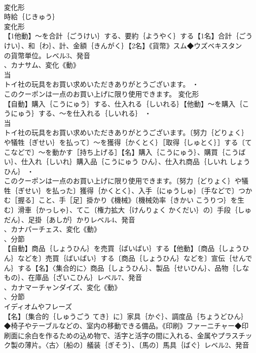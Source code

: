 \documentclass[8pt]{extreport}
\begin{document}
\begin{CJK}{UTF8}{min}
\\	変化形 
\\	時給｛じきゅう｝
\\	変化形 
\\	【1他動】～を合計｛ごうけい｝する、要約｛ようやく｝する【1名】合計｛ごうけい｝、和｛わ｝、計、金額｛きんがく｝【2名】《貨幣》スム◆ウズベキスタン
\\	の貨幣単位。レベル3、発音
\\	、カナサム、変化《動》
\\	当
\\	トイ社の玩具をお買い求めいただきありがとうございます。 ・
\\	このクーポンは一点のお買い上げに限り使用できます。	変化形 
\\	【自動】購入｛こうにゅう｝する、仕入れる｛しいれる｝【他動】～を購入｛こうにゅう｝する、～を仕入れる｛しいれる｝ ・
\\	当
\\	トイ社の玩具をお買い求めいただきありがとうございます。〔努力｛どりょく｝や犠牲｛ぎせい｝を払って〕～を獲得｛かくとく｝［取得｛しゅとく｝］する〔てこなどで〕～を動かす［持ち上げる］【名】購入｛こうにゅう｝、購買｛こうばい｝、仕入れ｛しいれ｝購入品｛こうにゅう ひん｝、仕入れ商品｛しいれ しょうひん｝ ・
\\	このクーポンは一点のお買い上げに限り使用できます。〔努力｛どりょく｝や犠牲｛ぎせい｝を払った〕獲得｛かくとく｝、入手｛にゅうしゅ｝〔手などで〕つかむ［握る］こと、手［足］掛かり《機械》〔機械効率｛きかい こうりつ｝を生む〕滑車｛かっしゃ｝、てこ〔権力拡大｛けんりょく かくだい｝の〕手段｛しゅだん｝、足掛｛あしが｝かりレベル4、発音
\\	、カナパーチェス、変化《動》
\\	、分節
\\	【自動】商品｛しょうひん｝を売買｛ばいばい｝する【他動】〔商品｛しょうひん｝などを〕売買｛ばいばい｝する〔商品｛しょうひん｝などを〕宣伝｛せんでん｝する【名】〈集合的に〉商品｛しょうひん｝、製品｛せいひん｝、品物｛しなもの｝、在庫品｛ざいこひん｝レベル7、発音
\\	、カナマーチャンダイズ、変化《動》
\\	、分節
\\	イディオムやフレーズ 
\\	【名】〔集合的｛しゅうごう てき｝に〕家具｛かぐ｝、調度品｛ちょうどひん｝◆椅子やテーブルなどの、室内の移動できる備品。《印刷》ファーニチャー◆印刷面に余白を作るための込め物で、活字と活字の間に入れる、金属やプラスチック製の薄片。〈古〉〔船の〕艤装｛ぎそう｝、〔馬の〕馬具｛ばぐ｝レベル2、発音

\end{CJK}
\end{document}
